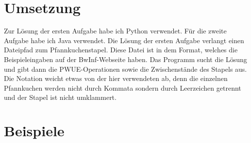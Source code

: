 \documentclass[a4paper,10pt,ngerman]{scrartcl}
\begin{document}
\section{Umsetzung}
Zur Lösung der ersten Aufgabe habe ich Python verwendet. Für die zweite Aufgabe
habe ich Java verwendet. Die Lösung der ersten Aufgabe verlangt einen Dateipfad zum Pfannkuchenstapel. Diese Datei ist in dem Format, welches die Beispieleingaben auf der BwInf-Webseite
haben. Das Programm sucht die Lösung und gibt dann die PWUE-Operationen sowie die Zwischenstände des Stapels aus. Die Notation weicht etwas von der hier verwendeten ab,
denn die einzelnen Pfannkuchen werden nicht durch Kommata sondern durch Leerzeichen getrennt und der Stapel ist nicht umklammert.
\section{Beispiele}
\end{document}
